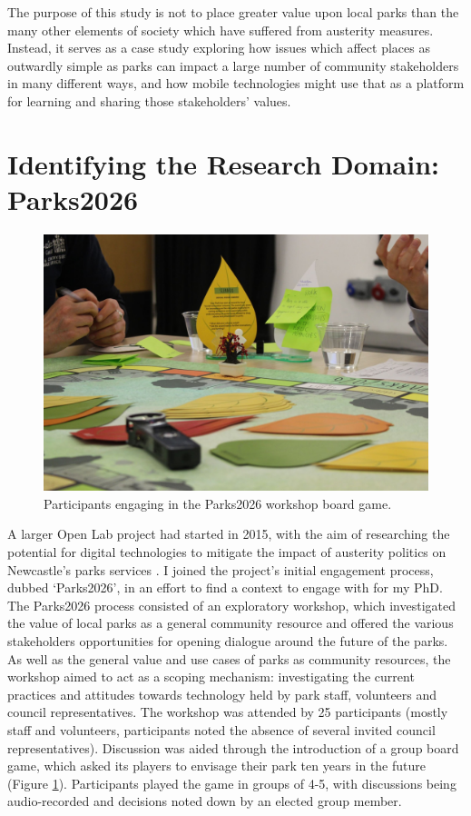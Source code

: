 The purpose of this study is not to place greater value upon local parks than the many other elements of society which have suffered from austerity measures. Instead, it serves as a case study exploring how issues which affect places as outwardly simple as parks can impact a large number of community stakeholders in many different ways, and how mobile technologies might use that as a platform for learning and sharing those stakeholders' values.

\section{Identifying the Research Domain: Parks2026}

\begin{figure}
  \centering
  \includegraphics[width=0.8\columnwidth]{images/chapter04/parks2026.jpg}
  \caption{Participants engaging in the Parks2026 workshop board game.}
  \label{fig:parks2026}
\end{figure}

A larger Open Lab project had started in 2015, with the aim of researching the potential for digital technologies to mitigate the impact of austerity politics on Newcastle's parks services \citep{Crivellaro2019}. I joined the project's initial engagement process, dubbed `Parks2026', in an effort to find a context to engage with for my PhD. The Parks2026 process consisted of an exploratory workshop, which investigated the value of local parks as a general community resource and offered the various stakeholders opportunities for opening dialogue around the future of the parks. As well as the general value and use cases of parks as community resources, the workshop aimed to act as a scoping mechanism: investigating the current practices and attitudes towards technology held by park staff, volunteers and council representatives. The workshop was attended by 25 participants (mostly staff and volunteers, participants noted the absence of several invited council representatives). Discussion was aided through the introduction of a group board game, which asked its players to envisage their park ten years in the future (Figure \ref{fig:parks2026}). Participants played the game in groups of 4-5, with discussions being audio-recorded and decisions noted down by an elected group member.

